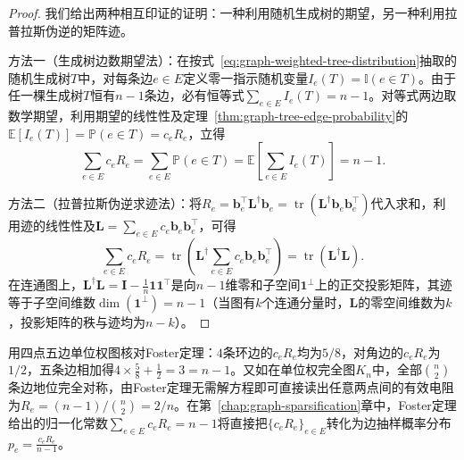 \begin{proof}
我们给出两种相互印证的证明：一种利用随机生成树的期望，另一种利用拉普拉斯伪逆的矩阵迹。

方法一（生成树边数期望法）：在按式~\eqref{eq:graph-weighted-tree-distribution}抽取的随机生成树$T$中，对每条边$e\in E$定义零一指示随机变量$I_e(T)=\mathbb I(e\in T)$。由于任一棵生成树$T$恒有$n-1$条边，必有恒等式$\sum_{e\in E}I_e(T)=n-1$。对等式两边取数学期望，利用期望的线性性及定理~\ref{thm:graph-tree-edge-probability}的$\mathbb E[I_e(T)]=\mathbb P(e\in T)=c_e R_e$，立得
\[
\sum_{e\in E}c_eR_e = \sum_{e\in E}\mathbb P(e\in T) = \mathbb E\!\left[\sum_{e\in E}I_e(T)\right] = n-1.
\]

方法二（拉普拉斯伪逆求迹法）：将$R_e=\bm b_e^\top\bm L^\dagger\bm b_e=\operatorname{tr}(\bm L^\dagger\bm b_e\bm b_e^\top)$代入求和，利用迹的线性性及$\bm L=\sum_{e\in E}c_e\bm b_e\bm b_e^\top$，可得
\[
\sum_{e\in E}c_eR_e
=\operatorname{tr}\!\left(\bm L^\dagger\sum_{e\in E}c_e\bm b_e\bm b_e^\top\right)
=\operatorname{tr}(\bm L^\dagger\bm L).
\]
在连通图上，$\bm L^\dagger\bm L=\bm I-\frac{1}{n}\bm 1\bm 1^\top$是向$n-1$维零和子空间$\bm 1^\perp$上的正交投影矩阵，其迹等于子空间维数$\operatorname{dim}(\bm 1^\perp)=n-1$（当图有$k$个连通分量时，$\bm L$的零空间维数为$k$，投影矩阵的秩与迹均为$n-k$）。
\end{proof}

用四点五边单位权图核对Foster定理：$4$条环边的$c_e R_e$均为$5/8$，对角边的$c_e R_e$为$1/2$，五条边相加得$4\times\frac58+\frac12=3=n-1$。又如在单位权完全图$K_n$中，全部$\binom{n}{2}$条边地位完全对称，由Foster定理无需解方程即可直接读出任意两点间的有效电阻为$R_e=(n-1)/\binom{n}{2}=2/n$。在第~\ref{chap:graph-sparsification}章中，Foster定理给出的归一化常数$\sum_{e\in E}c_e R_e=n-1$将直接把$\{c_e R_e\}_{e\in E}$转化为边抽样概率分布$p_e=\frac{c_e R_e}{n-1}$。
